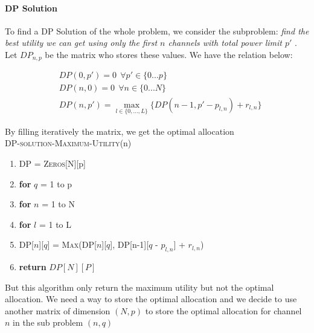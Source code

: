 \documentclass[11pt, oneside]{report}
\begin{document}
\paragraph{DP Solution} To find a DP Solution of the whole problem, we consider the subproblem: \textit{find the best utility we can get using only the first $n$ channels with total power limit $p'$ }. Let $DP_{n,p}$ be the matrix who stores these values. We have the relation below:

\begin{align*}
&DP(0,p') = 0 \ \  \forall p'\in \{0...p\} \\
&DP(n,0) = 0\ \ \forall n\in \{0...N\} \\
&DP(n,p') =  \max_{l \in \{0,...,L\}} \{ DP(n-1, p'-p_{l,n}) + r_{l,n} \}
\end{align*}

By filling iteratively the matrix, we get the optimal allocation\\

\noindent\textsc{DP-solution-Maximum-Utility}(n)
\begin{enumerate}[1\ ]
\setlength{\topsep}{0.05ex}
\setlength{\itemsep}{0.05ex}
\item DP = \textsc{Zeros}[N][p]
\item \textbf{for} $q$ = 1 to p
\item \qquad \textbf{for} $n$ = 1 to N
\item \qquad \qquad \textbf{for} $l$ = 1 to L
\item  \qquad \qquad \qquad DP[$n$][$q$] = \textsc{Max}(DP[$n$][$q$], DP[n-1][$q$ - $p_{l,n}$] + $r_{l,n}$)
\item \textbf{return} $DP[N][P]$
\end{enumerate}

But this algorithm only return the maximum utility but not the optimal allocation. We need a way to store the optimal allocation and we decide to use another matrix of dimension $(N,p)$ to store the optimal allocation for channel $n$ in the sub problem $(n,q)$
\end{document}
